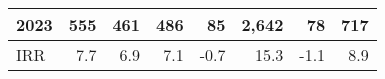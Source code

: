 \documentclass{article}
\begin{document}
\begin{table}[!ht]
\begin{tabular}{l | rrr | rr | rr}
        2023 & 555 & 461 & 486 & 85 & 2,642 & 78 & 717 \\ \hline
        IRR & 7.7 & 6.9 & 7.1 & -0.7 & 15.3 & -1.1 & 8.9 \\ \hline
    \end{tabular}
    \label{tab:end_balances}
\end{table}
\end{document}

